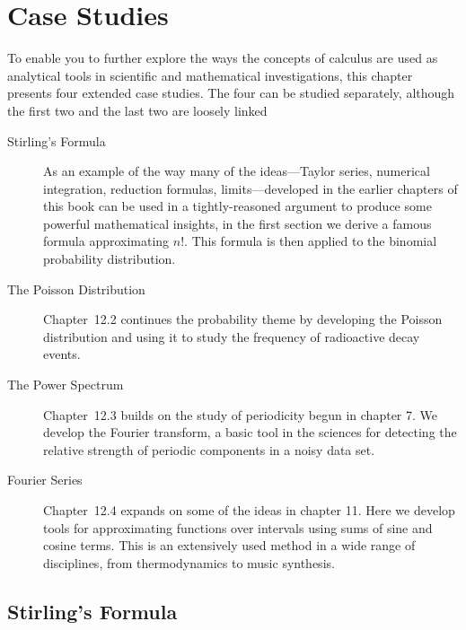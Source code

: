 

\chapter{Case Studies}
\label{chap:case-studies}

To enable you to further explore the ways the concepts of calculus are
used as analytical tools in scientific and mathematical
investigations, this chapter presents four extended case studies.  The
four can be studied separately, although the first two and the last
two are loosely linked
\begin{description}

\item[Stirling's Formula] As an example of the way many of the
  ideas---Taylor series, numerical integration, reduction formulas,
  limits---developed in the earlier chapters of this book can be used
  in a tightly-reasoned argument to produce some powerful mathematical
  insights, in the first section we derive a famous formula
  approximating $n!$.  This formula is then applied to the binomial
  probability distribution.

\item[The Poisson Distribution] Chapter~12.2 continues the probability
  theme by developing the Poisson distribution and using it to study
  the frequency of radioactive decay events.

\item[The Power Spectrum] Chapter~12.3 builds on the study of
  periodicity begun in chapter 7. We develop the Fourier transform, a
  basic tool in the sciences for detecting the relative strength of
  periodic components in a noisy data set.

\item[Fourier Series] Chapter~12.4 expands on some of the ideas in
  chapter 11.  Here we develop tools for approximating functions over
  intervals using sums of sine and cosine terms.  This is an
  extensively used method in a wide range of disciplines, from
  thermodynamics to music synthesis.
\end{description} 



\section{Stirling's Formula}
\label{sec:stirlings-formula}

